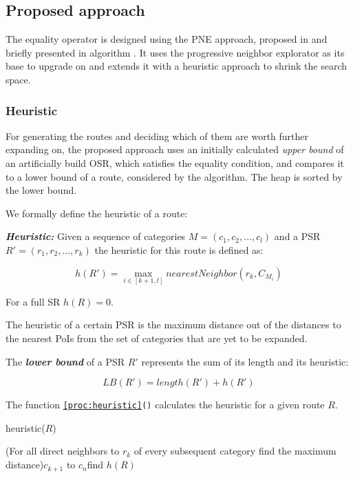 \subsection{Proposed approach} 
\label{sec:approachEO}
The equality operator is designed using the PNE approach, proposed in \cite{OSR} and briefly presented in algorithm \texttt{}. It uses the progressive neighbor explorator as its base to upgrade on and extends it with a heuristic approach to shrink the search space.

\subsubsection{Heuristic}
\label{sec:heuristic}
For generating the routes and deciding which of them are worth further expanding on, the proposed approach uses an initially calculated \textit{upper bound} of an artificially build OSR, which satisfies the equality condition, and compares it to a lower bound of a route, considered by the algorithm. The heap is sorted by the lower bound. 

We formally define the heuristic of a route:

\textbf{\textit{Heuristic:}} Given a sequence of categories $M = (c_1, c_2, ..., c_l)$ and a PSR $R' = (r_1, r_2, ..., r_k)$ the heuristic for this route is defined as: 

\begin{equation}
h(R') = \max_{i \in [k+1, l]} nearestNeighbor(r_k, C_{M_{i}})
\end{equation}

For a full SR $h(R) = 0$.

The heuristic of a certain PSR is the maximum distance out of the distances to the nearest PoIs from the set of categories that are yet to be expanded. 

The \textbf{\textit{lower bound}} of a PSR $R'$ represents the sum of its length and its heuristic:

\begin{equation}
LB(R') = length(R') + h(R')
\end{equation}

The function \texttt{\ref{proc:heuristic}()} calculates the heuristic for a given route $R$.

\begin{function}[htb!]
\caption{heuristic($R$)}
\label{proc:heuristic}

	\For(For all direct neighbors to $r_k$ of every subsequent category find the maximum distance){$c_{k+1}$ to $c_n$}{find $h(R)$\;}	

\end{function}

